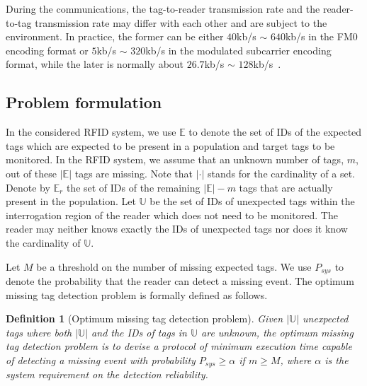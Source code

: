 \documentclass[10pt, twocolumn]{IEEEtran}
\newtheorem{definition}{Definition}
\begin{document}
During the communications, the tag-to-reader transmission rate and the reader-to-tag transmission rate may differ with each other and are subject to the environment. In practice, the former can be either $40$kb/s $\sim$ $640$kb/s in the FM0 encoding format or $5$kb/s $\sim$ $320$kb/s in the modulated subcarrier encoding format, while the later is normally about $26.7$kb/s $\sim$ $128$kb/s~\cite{C1G22005}.

\subsection{Problem formulation}

In the considered RFID system, we use $\mathbb{E}$ to denote the set of IDs of the expected tags which are expected to be present in a population and target tags to be monitored. In the RFID system, we assume that an unknown number of tags, $m$, out of these $|\mathbb{E}|$ tags are missing. Note that $|\cdot |$ stands for the cardinality of a set. Denote by $\mathbb{E}_r$ the set of IDs of the remaining $|\mathbb{E}|-m$ tags that are actually present in the population. Let $\mathbb{U}$ be the set of IDs of unexpected tags within the interrogation region of the reader which does not need to be monitored. The reader may neither knows exactly the IDs of unexpected tags nor does it know the cardinality of $\mathbb{U}$.

Let $M$ be a threshold on the number of missing expected tags.
We use $P_{sys}$ to denote the probability that the reader can detect a missing event. The optimum missing tag detection problem is formally defined as follows.
\begin{definition}[Optimum missing tag detection problem]
Given $|\mathbb{U}|$ unexpected tags where both $|\mathbb{U}|$ and the IDs of tags in $\mathbb{U}$ are unknown, the optimum missing tag detection problem is to devise a protocol of minimum execution time capable of detecting a missing event with probability $P_{sys} \ge \alpha$ if $m \ge M$, where $\alpha$ is the system requirement on the detection reliability.
\end{definition}
\end{document}
